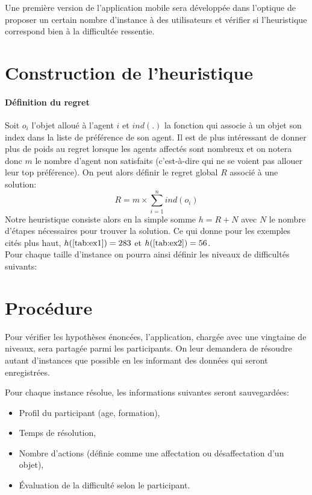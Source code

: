 \documentclass[a4paper, 10pt]{article}
\begin{document}
	Une première version de l'application mobile sera développée dans l'optique de proposer un certain nombre d'instance à des utilisateurs et vérifier si l'heuristique correspond bien à la difficultée ressentie.
	
	\section*{Construction de l'heuristique}
	
	\paragraph{Définition du regret}{Soit $o_i$ l'objet alloué à l'agent $i$ et $ind(.)$ la fonction qui associe à un objet son index dans la liste de préférence de son agent. Il est de plus intéressant de donner plus de poids au regret lorsque les agents affectés sont nombreux et on notera donc $m$ le nombre d'agent non satisfaits (c'est-à-dire qui ne se voient pas allouer leur top préférence). On peut alors définir le regret global $R$ associé à une solution:
	\begin{equation*}
		R = m \times \sum_{i=1}^n ind(o_i)
	\end{equation*}	
	Notre heuristique consiste alors en la simple somme $h = R + N$ avec $N$ le nombre d'étapes nécessaires pour trouver la solution. Ce qui donne pour les exemples cités plus haut, $h(\ref{tab:ex1}) = 283$ et $h(\ref{tab:ex2}) = 56$.
	}\\
	
	Pour chaque taille d'instance on pourra ainsi définir les niveaux de difficultés suivants:
	
	\section*{Procédure}
	
	Pour vérifier les hypothèses énoncées, l'application, chargée avec une vingtaine de niveaux, sera partagée parmi les participants. On leur demandera de résoudre autant d'instances que possible en les informant des données qui seront enregistrées.
	
	Pour chaque instance résolue, les informations suivantes seront sauvegardées:
	\begin{itemize}
		\item Profil du participant (age, formation),
		\item Temps de résolution,
		\item Nombre d'actions (définie comme une affectation ou désaffectation d'un objet),
		\item Évaluation de la difficulté selon le participant.
	\end{itemize}
	
\end{document}
